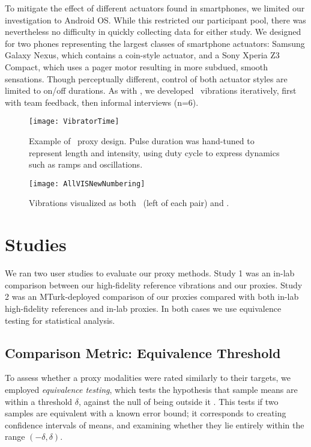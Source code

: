 To mitigate the effect of different actuators found in smartphones, we limited our investigation to Android OS.
While this restricted our participant pool, there was nevertheless no difficulty in  quickly collecting data for either study.
We designed for two phones representing the largest classes of smartphone actuators: Samsung Galaxy Nexus, which contains a coin-style actuator, and a Sony Xperia Z3 Compact, which uses a pager motor resulting in more subdued, smooth sensations.
Though perceptually different, control of both actuator styles are limited to on/off durations.
As with \linear, we developed \lofi~vibrations iteratively, first with team feedback, then informal interviews (n=6).
    
    \begin{figure}
        \centering
        \texttt{[image: VibratorTime]}
        \caption{Example of \lofi\ proxy design. Pulse duration was hand-tuned to represent length and intensity, using duty cycle to express dynamics such as ramps and oscillations.}
        \label{fig:vib:lofidesign}
    \end{figure}

 
    \begin{figure*}
        \centering
                \texttt{[image: AllVISNewNumbering]}
                \caption{Vibrations visualized as both \original\ (left of each pair) and \linear.}
            \label{fig:vis:ref:comparison}
        \end{figure*}


\section{Studies}
We ran two user studies to evaluate our proxy methods.
Study 1 was an in-lab comparison between our high-fidelity reference vibrations and our proxies.
Study 2 was an MTurk-deployed comparison of our proxies compared with both in-lab high-fidelity references and in-lab proxies.
In both cases we use equivalence testing for statistical analysis.

\subsection{Comparison Metric: Equivalence Threshold}
To assess whether a proxy modalities were rated similarly to their targets, we employed \emph{equivalence testing}, which tests the hypothesis that sample means are within a threshold $\delta$, against the null of being outside it \cite{Schuirmann1981}.
This tests if two samples are equivalent with a known error bound; it corresponds to creating confidence intervals of means, and examining whether they lie entirely within the range $(-\delta, \delta)$.

